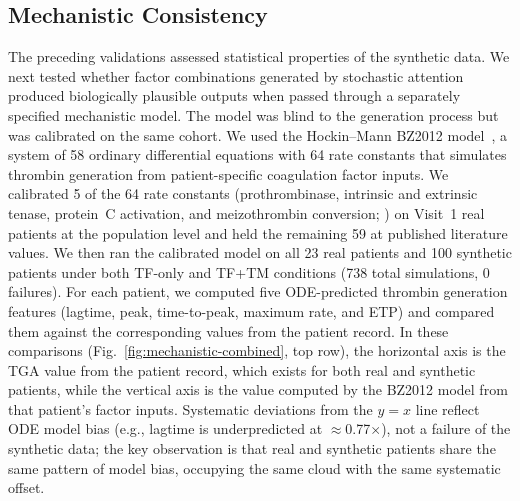 \subsection{Mechanistic Consistency}
\label{sec:results-l4}

The preceding validations assessed statistical properties of the synthetic data. We
next tested whether factor combinations generated by stochastic attention produced
biologically plausible outputs when passed through a separately specified mechanistic model.
The model was blind to the generation process but was calibrated on the same cohort.
We used the Hockin--Mann BZ2012 model~\citep{Hockin2002,BrummelZiedins2012}, a system
of 58 ordinary differential equations with 64 rate constants that simulates thrombin
generation from patient-specific coagulation factor inputs. We calibrated 5 of the
64 rate constants (prothrombinase, intrinsic and extrinsic tenase, protein~C
activation, and meizothrombin conversion; ) on Visit~1 real
patients at the population level and held the remaining 59 at published literature
values. We then ran the calibrated model on all 23 real patients and 100 synthetic
patients under both TF-only and TF+TM conditions (738 total simulations, 0 failures). For each patient, we
computed five ODE-predicted thrombin generation features (lagtime, peak, time-to-peak,
maximum rate, and ETP) and compared them against the corresponding values from the
patient record. In these comparisons (Fig.~\ref{fig:mechanistic-combined}, top row),
the horizontal axis is the TGA value from the patient record, which exists for both
real and synthetic patients, while the vertical axis is the value computed by the
BZ2012 model from that patient's factor inputs. Systematic deviations from the
$y{=}x$ line reflect ODE model bias (e.g., lagtime is underpredicted at
$\approx$0.77$\times$), not a failure of the synthetic data; the key observation is
that real and synthetic patients share the same pattern of model bias, occupying the
same cloud with the same systematic offset.

